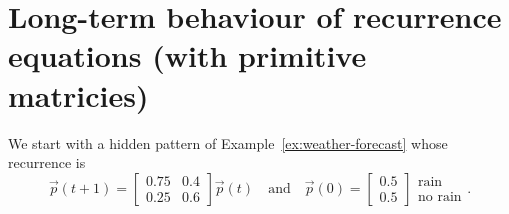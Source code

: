 \documentclass[../main.tex]{subfiles}
\begin{document}
 \section{Long-term behaviour of recurrence equations (with primitive matricies)}

We start with a hidden pattern of Example~\ref{ex:weather-forecast} whose recurrence is
\[
  \vec{p}(t+1) = 
  \begin{bmatrix}
    0.75 & 0.4 \\
    0.25 & 0.6
  \end{bmatrix}
  \vec{p}(t)
  \quad\text{and}\quad
  \vec{p}(0) = 
  \begin{bmatrix}
    0.5 \\ 0.5
  \end{bmatrix}
  \begin{array}{r}
    \text{rain} \\
    \text{no rain}
  \end{array}.
\]
\end{document}
